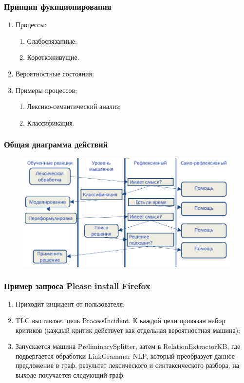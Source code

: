 \documentclass[14pt]{beamer}
\begin{document}
\begin{frame}
\frametitle{Принцип фукнционирования}
\begin{enumerate}
	\item Процессы:
\begin{enumerate}
	\item Слабосвязанные;
	\item Короткоживущие.
\end{enumerate}
\item Вероятностные состояния;
\item Примеры процессов;
\begin{enumerate}
	\item Лексико-семантический анализ;
	\item Классификация.
\end{enumerate}
\end{enumerate}
\end{frame}

\begin{frame}
\frametitle{Общая диаграмма действий}
\begin{figure} [h] 
  \center
  \includegraphics [scale=0.35] {ShortLefecycle}
  \label{img:ShortLefecycle}  
\end{figure}
\end{frame}


\begin{frame}
\frametitle{Пример запроса Please install Firefox}
\begin{enumerate}
	\item Приходит инцидент от пользователя;
	\item TLC выставляет цель ProcessIncident. К каждой цели привязан набор критиков (каждый критик действует как отдельная вероятностная машина);
	\item Запускается машина PreliminarySplitter, затем в RelationExtractorKB, где подвергается обработки LinkGrammar NLP, который преобразует данное предложение в граф, результат лексического и синтаксического разбора, на выходе получается следующий граф.
\end{enumerate}
\end{frame}
\end{document}
